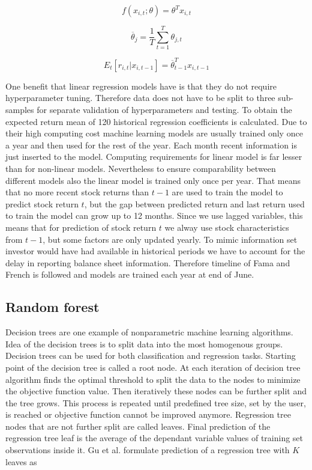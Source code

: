 \documentclass{article}
\begin{document}
\begin{equation}
f(x_{i, t}; \theta) = \theta^T x_{i, t}
\end{equation}

\begin{equation}
\overline \theta_j = \frac{1}{T} \sum^{T}_{t=1}\theta_{j, t}
\end{equation}

\begin{equation}
E_t \left[ r_{i, t} | x_{i, t-1} \right] = \overline \theta_{t-1}^T x_{i, t-1}
\end{equation}

One benefit that linear regression models have is that they do not require hyperparameter tuning. Therefore data  does not have to be split to three sub-samples for separate validation of hyperparameters and testing. To obtain the expected return mean of 120 historical regression coefficients is calculated. Due to their high computing cost machine learning models are usually trained only once a year and then used for the rest of the year. Each month recent information is just inserted to the model. Computing requirements for linear model is far lesser than for non-linear models. Nevertheless to ensure comparability between different models also the linear model is trained only once per year. That means that no more recent stock returns than $t-1$ are used to train the model to predict stock return $t$, but the gap between predicted return and last return used to train the model can grow up to 12 months. Since we use lagged variables, this means that for prediction of stock return $t$ we alway use stock characteristics from $t-1$, but some factors are only updated yearly. To mimic information set investor would have had available in historical periods we have to account for the delay in reporting balance sheet information. Therefore timeline of Fama and French \citeyear{FAMA19933} is followed and models are trained each year at end of June. 

\subsection{Random forest}

Decision trees are one example of nonparametric machine learning algorithms. Idea of the decision trees is to split data into the most homogenous groups. Decision trees can be used for both classification and regression tasks. Starting point of the decision tree is called a root node. At each iteration of decision tree algorithm finds the optimal threshold to split the data to the nodes to minimize the objective function value. Then iteratively these nodes can be further split and the tree grows. This process is repeated until predefined tree size, set by the user, is reached or objective function cannot be improved anymore. Regression tree nodes that are not further split are called leaves. Final prediction of the regression tree leaf is the average of the dependant variable values of training set observations inside it. Gu et al. \citeyear{guetal} formulate prediction of a regression tree with $K$ leaves as 
\end{document}
